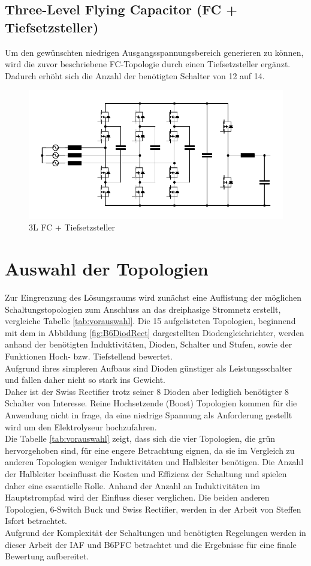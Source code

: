 	
	\subsection{Three-Level Flying Capacitor (FC + Tiefsetzsteller)}
		Um den gewünschten niedrigen Ausgangsspannungsbereich generieren zu können, wird die zuvor beschriebene FC-Topologie durch einen Tiefsetzsteller ergänzt. Dadurch erhöht sich die Anzahl der benötigten Schalter von 12 auf 14.
		\begin{figure}[H]
			\centering
			\includegraphics[width=0.9\linewidth]{content/Grafiken/3L-FC-Boost+Buck}
			\caption{3L FC + Tiefsetzsteller}
			\label{fig:3l-fc-boostbuck}
		\end{figure}

\section{Auswahl der Topologien}
Zur Eingrenzung des Lösungsraums wird zunächst eine Auflistung der möglichen Schaltungstopologien zum Anschluss an das dreiphasige Stromnetz erstellt, vergleiche Tabelle \ref{tab:vorauswahl}. Die 15 aufgelisteten Topologien, beginnend mit dem in Abbildung \ref{fig:B6DiodRect} dargestellten Diodengleichrichter, werden anhand der benötigten Induktivitäten, Dioden, Schalter und Stufen, sowie der Funktionen Hoch- bzw. Tiefstellend bewertet.\\
Aufgrund ihres simpleren Aufbaus sind Dioden günstiger als Leistungsschalter und fallen daher nicht so stark ins Gewicht. \\
Daher ist der Swiss Rectifier trotz seiner 8 Dioden aber lediglich benötigter 8 Schalter von Interesse. Reine Hochsetzende (Boost) Topologien kommen für die Anwendung nicht in frage, da eine niedrige Spannung als Anforderung gestellt wird um den Elektrolyseur hochzufahren. \\
Die Tabelle \ref{tab:vorauswahl} zeigt, dass sich die vier Topologien, die grün hervorgehoben sind, für eine engere Betrachtung eignen, da sie im Vergleich zu anderen Topologien weniger Induktivitäten und Halbleiter benötigen. Die Anzahl der Halbleiter beeinflusst die Kosten und Effizienz der Schaltung und spielen daher eine essentielle Rolle. Anhand der Anzahl an Induktivitäten im Hauptstrompfad wird der Einfluss dieser verglichen. Die beiden anderen Topologien, 6-Switch Buck und Swiss Rectifier, werden in  der Arbeit von Steffen Isfort betrachtet.\\
Aufgrund der Komplexität der Schaltungen und benötigten Regelungen werden in dieser Arbeit der \gls{IAF} und \gls{B6PFC} betrachtet und die Ergebnisse für eine finale Bewertung aufbereitet.

